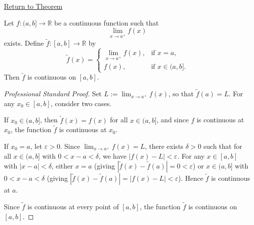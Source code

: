 \newpage
{}
\label{prf:continuous-extension-closed-interval}

\begin{remark*}[Return]
\hyperref[prop:continuous-extension-closed-interval]{Return to Theorem}
\end{remark*}

\begin{theorem*}
Let $f:(a,b]\to\mathbb{R}$ be a continuous function such that
\[
  \lim_{x\to a^+} f(x)
\]
exists.
Define $\widetilde{f}:[a,b]\to\mathbb{R}$ by
\[
  \widetilde{f}(x)=
  \begin{cases}
    \lim_{x\to a^+} f(x), & \text{if } x=a,\\[4pt]
    f(x), & \text{if } x\in(a,b].
  \end{cases}
\]
Then $\widetilde{f}$ is continuous on $[a,b]$.
\end{theorem*}

\begin{proof}[Professional Standard Proof]
\LRAProofBodyStart
Set $L := \lim_{x\to a^+} f(x)$, so that $\widetilde{f}(a) = L$. For any $x_0 \in [a,b]$, consider two cases.

If $x_0 \in (a,b]$, then $\widetilde{f}(x) = f(x)$ for all $x \in (a,b]$, and since $f$ is continuous at $x_0$, the function $\widetilde{f}$ is continuous at $x_0$.

If $x_0 = a$, let $\varepsilon > 0$. Since $\lim_{x\to a^+} f(x) = L$, there exists $\delta > 0$ such that for all $x \in (a,b]$ with $0 < x - a < \delta$, we have $|f(x) - L| < \varepsilon$. For any $x \in [a,b]$ with $|x - a| < \delta$, either $x = a$ (giving $|\widetilde{f}(x) - \widetilde{f}(a)| = 0 < \varepsilon$) or $x \in (a,b]$ with $0 < x - a < \delta$ (giving $|\widetilde{f}(x) - \widetilde{f}(a)| = |f(x) - L| < \varepsilon$). Hence $\widetilde{f}$ is continuous at $a$.

Since $\widetilde{f}$ is continuous at every point of $[a,b]$, the function $\widetilde{f}$ is continuous on $[a,b]$.
\end{proof}

